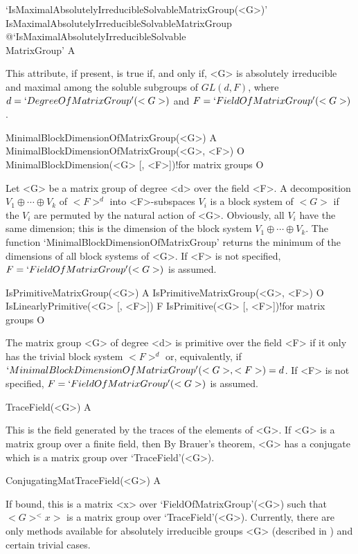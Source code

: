 \>`IsMaximalAbsolutelyIrreducibleSolvableMatrixGroup(<G>)'%
{IsMaximalAbsolutelyIrreducibleSolvableMatrixGroup}%
@{`IsMaximalAbsolutelyIrreducibleSolvable\\MatrixGroup'} A

This attribute, if present, is true if, and only if, <G> is absolutely irreducible and maximal among 
the soluble subgroups of $GL(d, F)$, where
$d = `DegreeOfMatrixGroup'(<G>)$ and
$F = `FieldOfMatrixGroup'(<G>)$. 


\>MinimalBlockDimensionOfMatrixGroup(<G>) A
\>MinimalBlockDimensionOfMatrixGroup(<G>, <F>) O
\>MinimalBlockDimension(<G> [, <F>])!{for matrix groups} O

Let <G> be a matrix group of degree <d> over the field <F>.  A 
decomposition $V_1 \oplus \cdots \oplus V_k$ of $<F>^d$ into <F>-subspaces
$V_i$ is a block system of $<G>$ if the $V_i$ are permuted by the natural
action of <G>. Obviously, all $V_i$ have the same dimension; this is the
dimension of the block system
$V_1 \oplus \cdots \oplus V_k$. The function
`MinimalBlockDimensionOfMatrixGroup' returns the minimum of the dimensions
of all block systems of <G>. If <F> is not specified, $F =
`FieldOfMatrixGroup'(<G>)$ is assumed.

\>IsPrimitiveMatrixGroup(<G>) A
\>IsPrimitiveMatrixGroup(<G>, <F>) O
\>IsLinearlyPrimitive(<G> [, <F>]) F
\>IsPrimitive(<G> [, <F>])!{for matrix groups} O

The matrix group <G> of degree <d> is primitive over the field <F> if it
only has the trivial block system $<F>^d$ or, equivalently, if
$`MinimalBlockDimensionOfMatrixGroup'(<G>, <F>) = d$. If <F> is not
specified, $F = `FieldOfMatrixGroup'(<G>)$ is assumed.




\>TraceField(<G>) A

This is the field generated by the traces of the elements of <G>. 
If <G> is a matrix group over a finite field, then By Brauer's
theorem, <G> has a conjugate which is a matrix group over `TraceField'(<G>).

\>ConjugatingMatTraceField(<G>) A

If bound, this is a matrix <x> over `FieldOfMatrixGroup'(<G>) such that
$<G>^<x>$ is a  matrix group over `TraceField'(<G>). Currently, there are
only methods available for absolutely irreducible groups <G> (described in
\cite{GH}) and certain trivial cases. 

